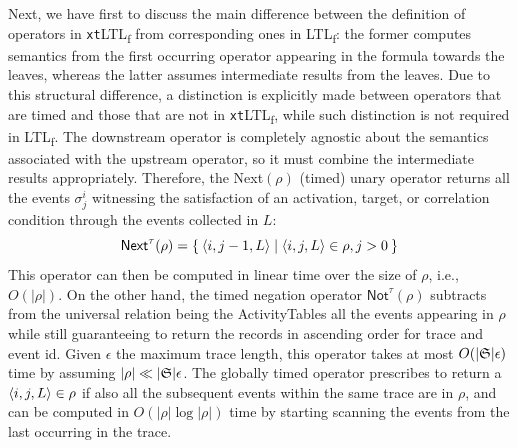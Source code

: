 \documentclass[sigconf]{acmart}
\begin{document}
Next, we have first to discuss the main difference between the definition of operators in  \texttt{xt}LTL\textsubscript{f} from corresponding ones in LTL\textsubscript{f}: the former computes semantics from the first occurring operator appearing in the formula towards the leaves, whereas the latter assumes intermediate results from the leaves. 		Due to this structural difference, a distinction is explicitly made between operators that are timed and those that are not in \texttt{xt}LTL\textsubscript{f}, while such distinction is not required in LTL\textsubscript{f}. The downstream operator is completely agnostic about the semantics associated with the upstream operator, so it must combine the intermediate results appropriately. Therefore, the \textsf{Next}$(\rho)$ (timed) unary operator returns all the events $\sigma^i_j$ witnessing the satisfaction of an activation, target, or correlation condition through the events collected in $L$:
\[\textsf{Next}^\tau(\rho)=\Set{\braket{i,j-1,L}|\braket{i,j,L}\in\rho,j>0}\]
This operator can then be computed in linear time over the size of $\rho$, i.e., $O(|\rho|)$.
On the other hand, the timed negation operator $\textsf{Not}^\tau(\rho)$ subtracts from the universal relation being the \textsf{ActivityTables} all the events appearing in $\rho$ while still guaranteeing to return the records in ascending order for trace and event id. Given $\epsilon$ the maximum trace length, this operator takes at most $O(|\mathfrak{S}|\epsilon)$ time by assuming $|\rho|\ll |\mathfrak{S}|\epsilon$. The globally timed operator prescribes to return a $\braket{i,j,L}\in\rho$ if also all the subsequent events within the same trace are in $\rho$, and can be computed in $O(|\rho| \log|\rho|)$ time by starting scanning the events from the last occurring in the trace.  
\end{document}
